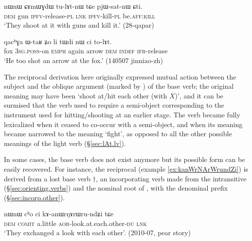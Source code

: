 \begin{exe}
\ex \label{ex:CAmWGdW.tulAtnW}
\gll nɯnɯ ɕɤmɯɣdɯ tu-lɤt-nɯ tɕe pjɯ-sat-nɯ ɕti. \\
\textsc{dem} gun \textsc{ipfv}-release-\textsc{pl} \textsc{lnk} \textsc{ipfv}-kill-\textsc{pl} be.\textsc{aff}:\textsc{kill} \\
\glt `They shoot at it with guns and kill it.' (28-qapar)
\end{exe}

\begin{exe}
\ex \label{ex:qachGa.WtaR.tWdi.tolAt}
\gll qacʰɣa ɯ-taʁ ʑo li tɯdi nɯ ci to-lɤt. \\
fox \textsc{3sg}.\textsc{poss}-on \textsc{emph} again arrow \textsc{dem} \textsc{indef} \textsc{ifr}-release \\
\glt `He too shot an arrow at the fox.' (140507 jinniao-zh)
\end{exe}


The reciprocal derivation here originally expressed mutual action between the subject and the oblique argument (marked by ) of the base verb; the original meaning may have been `shoot at/hit each other (with $X$)', and it can be surmised that the verb  used to require a semi-object corresponding to the instrument used for hitting/shooting at an earlier stage. The verb  became fully lexicalized when it ceased to co-occur with a semi-object, and when its meaning became narrowed to the meaning `fight', as opposed to all the other possible meanings of the light verb  (§\ref{sec:lAt.lv}).
 
In some cases, the base verb does not exist anymore but its possible form can be easily recovered. For instance, the reciprocal  (example \ref{ex:kanWrNArWrundZi}) is derived from a lost base verb $\dagger$, an incorporating verb made from the intransitive  (§\ref{sec:orienting.verbs})  and the nominal root of , with the denominal prefix  (§\ref{sec:incorp.other}).

\begin{exe}
\ex \label{ex:kanWrNArWrundZi}
\gll   nɯnɯ cʰo ci kɤ-anɯrŋɤrɯru-ndʑi tɕe \\
\textsc{dem} \textsc{comit} a.little \textsc{aor}-look.at.each.other-\textsc{du} \textsc{lnk} \\
\glt  `They exchanged a look with each other'. (2010-07, pear story)
\end{exe}

